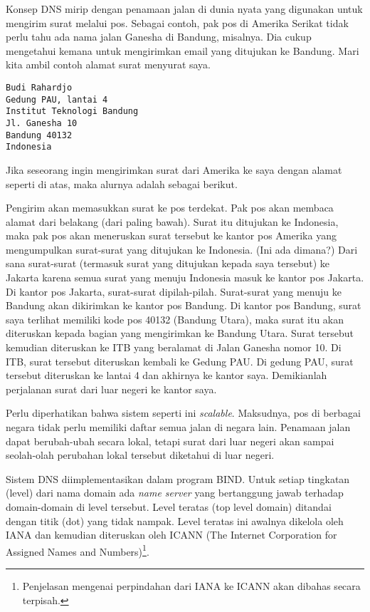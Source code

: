 Konsep DNS mirip dengan penamaan jalan di dunia nyata yang digunakan untuk
mengirim surat melalui pos. Sebagai contoh, pak pos di Amerika Serikat tidak
perlu tahu ada nama jalan Ganesha di Bandung, misalnya. Dia cukup mengetahui
kemana untuk mengirimkan email yang ditujukan ke Bandung. Mari kita ambil
contoh alamat surat menyurat saya.

\begin{verbatim}
Budi Rahardjo
Gedung PAU, lantai 4
Institut Teknologi Bandung
Jl. Ganesha 10
Bandung 40132
Indonesia
\end{verbatim}

Jika seseorang ingin mengirimkan surat dari Amerika ke saya dengan alamat
seperti di atas, maka alurnya adalah sebagai berikut.

Pengirim akan memasukkan surat ke pos terdekat. Pak pos akan membaca alamat
dari belakang (dari paling bawah). Surat itu ditujukan ke Indonesia, maka pak
pos akan meneruskan surat tersebut ke kantor pos Amerika yang mengumpulkan
surat-surat yang ditujukan ke Indonesia. (Ini ada dimana?) Dari sana
surat-surat (termasuk surat yang ditujukan kepada saya tersebut) ke Jakarta
karena semua surat yang menuju Indonesia masuk ke kantor pos Jakarta. Di kantor
pos Jakarta, surat-surat dipilah-pilah. Surat-surat yang menuju ke Bandung akan
dikirimkan ke kantor pos Bandung. Di kantor pos Bandung, surat saya terlihat
memiliki kode pos 40132 (Bandung Utara), maka surat itu akan diteruskan kepada
bagian yang mengirimkan ke Bandung Utara. Surat tersebut kemudian diteruskan ke
ITB yang beralamat di Jalan Ganesha nomor 10. Di ITB, surat tersebut diteruskan
kembali ke Gedung PAU. Di gedung PAU, surat tersebut diteruskan ke lantai 4 dan
akhirnya ke kantor saya. Demikianlah perjalanan surat dari luar negeri ke
kantor saya.

Perlu diperhatikan bahwa sistem seperti ini {\em scalable}. Maksudnya, pos di
berbagai negara tidak perlu memiliki daftar semua jalan di negara lain.
Penamaan jalan dapat berubah-ubah secara lokal, tetapi surat dari luar negeri
akan sampai seolah-olah perubahan lokal tersebut diketahui di luar negeri.

Sistem DNS diimplementasikan dalam program BIND.
Untuk setiap tingkatan (level) dari nama domain ada {\em name server} yang
bertanggung jawab terhadap domain-domain di level tersebut. Level teratas (top
level domain) ditandai dengan titik (dot) yang tidak nampak. Level teratas ini
awalnya dikelola oleh IANA dan kemudian diteruskan oleh ICANN (The Internet 
Corporation for Assigned Names and Numbers)\footnote{Penjelasan mengenai
perpindahan dari IANA ke ICANN akan dibahas secara terpisah.}.

